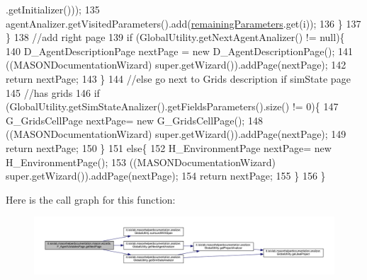 \begin{DoxyCode}
      .getInitializer()));
135                 agentAnalizer.getVisitedParameters().add(\hyperlink{classit_1_1isislab_1_1masonhelperdocumentation_1_1mason_1_1wizards_1_1_f___agent_variables_page_ade36fab1c0254d3ac94c077a06fb75f2}{remainingParameters}.get(i));
136             \}
137         \}
138         \textcolor{comment}{//add right page}
139         \textcolor{keywordflow}{if} (GlobalUtility.getNextAgentAnalizer() != null)\{
140             D\_AgentDescriptionPage nextPage = \textcolor{keyword}{new} D\_AgentDescriptionPage();
141             ((MASONDocumentationWizard) super.getWizard()).addPage(nextPage);
142             \textcolor{keywordflow}{return} nextPage;
143         \}
144         \textcolor{comment}{//else go next to Grids description if simState page}
145         \textcolor{comment}{//has grids}
146         \textcolor{keywordflow}{if} (GlobalUtility.getSimStateAnalizer().getFieldsParameters().size() != 0)\{
147             G\_GridsCellPage nextPage= \textcolor{keyword}{new} G\_GridsCellPage();
148             ((MASONDocumentationWizard) super.getWizard()).addPage(nextPage); 
149             \textcolor{keywordflow}{return} nextPage; 
150         \}
151         \textcolor{keywordflow}{else}\{
152             H\_EnvironmentPage nextPage= \textcolor{keyword}{new} H\_EnvironmentPage();
153             ((MASONDocumentationWizard) super.getWizard()).addPage(nextPage); 
154             \textcolor{keywordflow}{return} nextPage; 
155         \}
156     \}
\end{DoxyCode}


Here is the call graph for this function\-:\nopagebreak
\begin{figure}[H]
\begin{center}
\leavevmode
\includegraphics[width=350pt]{classit_1_1isislab_1_1masonhelperdocumentation_1_1mason_1_1wizards_1_1_f___agent_variables_page_adb2fda5d8a33bb1cb27eda1854c5a89b_cgraph}
\end{center}
\end{figure}


